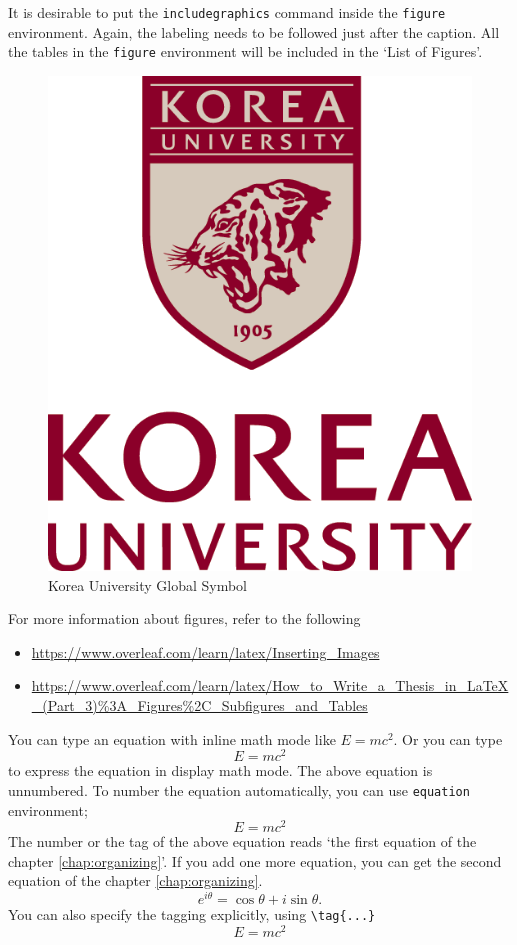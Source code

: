 \documentclass{report}
\begin{document}
It is desirable to put the \texttt{includegraphics} command inside the \texttt{figure} environment.
Again, the labeling needs to be followed just after the caption.
All the tables in the \texttt{figure} environment will be included in the `List of Figures'.

\begin{figure}[h]
\begin{center}
\includegraphics[width=.2\textwidth]{kumark.png}
\end{center}
\caption{Korea University Global Symbol}
\label{fig:kumark}
\end{figure}

For more information about figures, refer to the following
\begin{itemize}
\item
\url{https://www.overleaf.com/learn/latex/Inserting_Images}
\item
\url{https://www.overleaf.com/learn/latex/How_to_Write_a_Thesis_in_LaTeX_(Part_3)%3A_Figures%2C_Subfigures_and_Tables}
\end{itemize}


You can type an equation with inline math mode like \(E=mc^2\). %
Or you can type
\[E=mc^2\]
to express the equation in display math mode.
The above equation is unnumbered.
To number the equation automatically, you can use \texttt{equation} environment;
\begin{equation}
E=mc^2
\end{equation}
The number or the tag of the above equation reads `the first equation of the chapter \ref{chap:organizing}'.
If you add one more equation, you can get the second equation of the chapter \ref{chap:organizing}.
\begin{equation}
e^{i\theta}=\cos\theta+i\sin\theta.
\end{equation}
You can also specify the tagging explicitly, using \verb|\tag{...}|
\[E=mc^2\tag{$*$}\]
\end{document}
